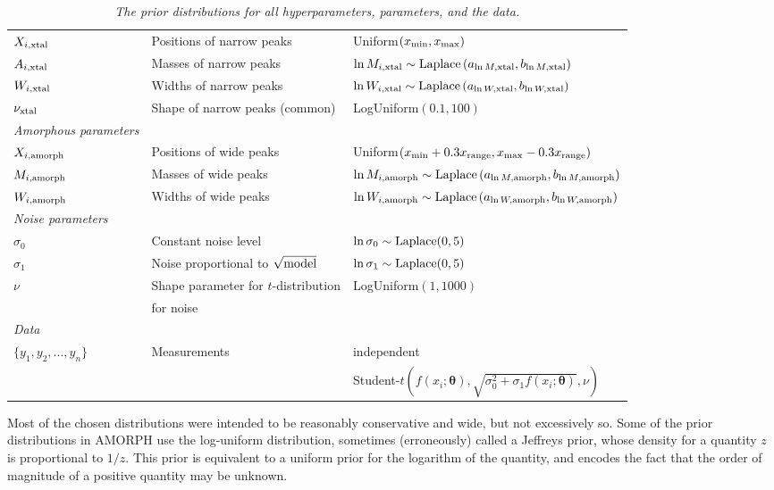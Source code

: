 \documentclass[review]{elsarticle}
\newcommand{\params}{\boldsymbol{\theta}}
\newcommand{\changed}{\color{blue}}
\begin{document}
\begin{table}[!ht]
\begin{tabular}{|lll|}
$X_{i, \rm xtal}$ & Positions of narrow peaks &
                            Uniform$(x_{\rm min}, x_{\rm max})$ \\
$A_{i, \rm xtal}$ & {\changed Masses} of narrow peaks &
{\changed
 $\ln M_{i, \rm xtal} \sim \textnormal{Laplace}\left(a_{\ln M, \rm xtal}, b_{\ln M, \rm xtal}\right)$} \\
$W_{i, \rm xtal}$ & Widths of narrow peaks &
 $\ln W_{i, \rm xtal} \sim \textnormal{Laplace}\left(a_{\ln W, \rm xtal}, b_{\ln W, \rm xtal}\right)$ \\
{\changed $\nu_{\rm xtal}$} &  {\changed Shape of narrow peaks (common)} &  {\changed LogUniform$(0.1, 100)$}\\
\hline
{\em Amorphous parameters}&&\\
$X_{i, \rm amorph}$ & Positions of wide peaks &
          Uniform$(x_{\rm min}+0.3x_{\rm range}, x_{\rm max}-0.3x_{\rm range})$ \\
{\changed $M_{i, \rm amorph}$} &  {\changed Masses} of wide peaks &
 {\changed  $\ln M_{i, \rm amorph} \sim \textnormal{Laplace}\left(a_{\ln M, \rm amorph}, b_{\ln M, \rm amorph}\right)$} \\
$W_{i, \rm amorph}$ & Widths of wide peaks &
 $\ln W_{i, \rm amorph} \sim \textnormal{Laplace}\left(a_{\ln W, \rm amorph}, b_{\ln W, \rm amorph}\right)$ \\
\hline
{\em Noise parameters}&&\\
$\sigma_0$ &    Constant noise level  &   $\ln \sigma_0 \sim \textnormal{Laplace}(0,5)$\\
$\sigma_1$ &    Noise proportional to $\sqrt{\textnormal{model}}$   &  $\ln \sigma_1 \sim \textnormal{Laplace}(0,5)$ \\
$\nu$     &   Shape parameter for $t$-distribution&LogUniform$(1, 1000)$\\ &for noise   &   \\
\hline
{\em Data}&&\\
$\{y_1, y_2, ..., y_n\}$  &   Measurements    & independent \\ && Student-$t\left(f(x_i; \params), \sqrt{\sigma_0^2 + \sigma_1f(x_i; \params)},\nu\right)$\\
\hline
\end{tabular}
\caption{\it The prior distributions for all hyperparameters,
parameters, and the data.\label{tab:priors}}
\end{table}

Most of the chosen distributions were intended to be reasonably
conservative and wide, {\changed but not excessively so}.
Some of the prior distributions in AMORPH use the log-uniform distribution,
sometimes (erroneously) called a Jeffreys prior, whose density for a quantity
$z$ is proportional to $1/z$. {\changed This prior is equivalent to a uniform prior
for the logarithm of the quantity, and encodes the fact that the order of magnitude
of a positive quantity may be unknown.}
\end{document}

